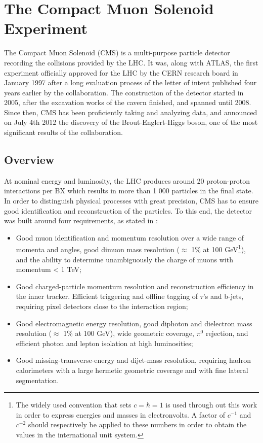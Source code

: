 \chapter{The Compact Muon Solenoid Experiment}
\label{chap:I-3-cms}

	The Compact Muon Solenoid (CMS) \cite{1748-0221-3-08-S08004} is a multi-purpose particle detector recording the collisions provided by the LHC. It was, along with ATLAS, the first experiment officially approved for the LHC by the CERN research board in January 1997 after a long evaluation process of the letter of intent published four years earlier by the collaboration. The construction of the detector started in 2005, after the excavation works of the cavern finished, and spanned until 2008. Since then, CMS has been proficiently taking and analyzing data, and announced on July 4th 2012 the discovery of the Brout-Englert-Higgs boson, one of the most significant results of the collaboration.

  \section{Overview}

    At nominal energy and luminosity, the LHC produces around 20 proton-proton interactions per BX which results in more than 1 000 particles in the final state. In order to distinguish physical processes with great precision, CMS has to ensure good identification and reconstruction of the particles. To this end, the detector was built around four requirements, as stated in \cite{1748-0221-3-08-S08004}:
    \begin{itemize}
      \item Good muon identification and momentum resolution over a wide range of momenta and angles, good dimuon mass resolution ($ \approx $ 1\% at 100 GeV\footnote{The widely used convention that sets $ c = \hbar = 1 $ is used through out this work in order to express energies and masses in electronvolts. A factor of $c^{-1}$ and $c^{-2}$ should respectively be applied to these numbers in order to obtain the values in the international unit system.}), and the ability to determine unambiguously the charge of muons with momentum < 1 TeV;
      \item Good charged-particle momentum resolution and reconstruction efficiency in the inner tracker. Efficient triggering and offline tagging of $ \tau $'s and b-jets, requiring pixel detectors close to the interaction region;
      \item Good electromagnetic energy resolution, good diphoton and dielectron mass resolution ($ \approx $ 1\% at 100 GeV), wide geometric coverage, $ \pi^0 $ rejection, and efficient photon and lepton isolation at high luminosities;
      \item Good missing-transverse-energy and dijet-mass resolution, requiring hadron calorimeters with a large hermetic geometric coverage and with fine lateral segmentation. \\
    \end{itemize}

